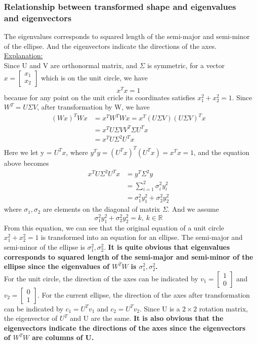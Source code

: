 \documentclass{article}
\begin{document}
\subsubsection*{Relationship between transformed shape and eigenvalues and eigenvectors}
The eigenvalues corresponds to squared length of the semi-major and semi-minor of the ellipse. And the eigenvectors indicate the directions of the axes. \\
\uline{Explanation:}\\
Since U and V are orthonormal matrix, and $\Sigma$ is symmetric, for a vector $x = \begin{bmatrix} x_1 \\ x_2 \end{bmatrix}$ which is on the unit circle, we have
\[
x^T x = 1
\]
because for any point on the unit cricle its coordinates satisfies $x_1^2 + x_2^2 = 1$. Since $W^T = U \Sigma V$, after transformation by W, we have
\begin{align*}
    (W x)^T W x &= x^T W^T W x = x^T (U \Sigma V)(U \Sigma V)^T x \\
                &= x^T U \Sigma V V^T \Sigma U^T x \\
                &= x^T U \Sigma^2 U^T x \\
\end{align*}
Here we let y = $U^T x$, where $y^T y = (U^T x)^T (U^T x) = x^T x = 1$, and the equation above becomes
\newpage
\begin{align*}
    x^T U \Sigma^2 U^T x &= y^T \Sigma^2 y \\
                         &= \sum_{i=1}^{2} \sigma_i^2 y_i^2 \\
                         &= \sigma_1^2 y_1^2 + \sigma_2^2 y_2^2
\end{align*}
where  $\sigma_1, \sigma_2$ are elements on the diagonal of matrix $\Sigma$. And we assume 
\[
\sigma_1^2 y_1^2 + \sigma_2^2 y_2^2 = k, \ k \in \mathbb{R}
\]
From this equation, we can see that the original equation of a unit circle  $x_1^2 + x_2^2 = 1$ is transformed into an equation for an ellipse. The semi-major and semi-minor of the ellipse is $\sigma_1^2, \sigma_2^2$.
\textbf{It is quite obvious that eigenvalues corresponds to squared length of the semi-major and semi-minor of the ellipse since the eigenvalues of $W^T W$ is $\sigma_1^2, \sigma_2^2$.}\\
For the unit circle, the direction of the axes can be indicated by $v_1 = \begin{bmatrix} 1 \\ 0 \end{bmatrix}$ and $v_2 = \begin{bmatrix} 0 \\ 1 \end{bmatrix}$.
For the current ellipse, the direction of the axes after transformation can be indicated by $c_1 = U^T v_1$ and $c_2 = U^T v_2$. Since U is a $2 \times 2$ rotation matrix, the eigenvector of $U^T$ and U are the same. \textbf{It is also obvious that the eigenvectors indicate the directions of the axes since the eigenvectors of $W^T W$ are columns of U.}
 
\end{document}
